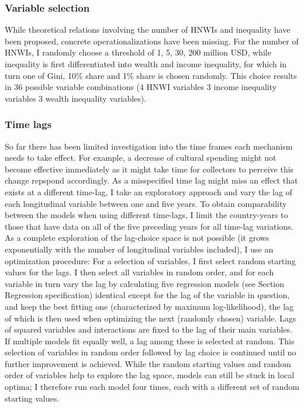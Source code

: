 \documentclass[11pt]{article}
\begin{document}
\subsubsection*{Variable selection}
\label{vrbl_slctn}
While theoretical relations involving the number of HNWIs and inequality have been proposed, concrete operationalizations have been missing.
For the number of HNWIs, I randomly choose a threshold of 1, 5, 30, 200 million USD, while inequality is first differentiated into wealth and income inequality, for which in turn one of Gini, 10\% share and 1\% share is chosen randomly.
This choice results in 36 possible variable combinations (4 HNWI variables \texttimes{} 3 income inequality variables \texttimes{} 3 wealth inequality variables). 


\subsubsection*{Time lags}

So far there has been limited investigation into the time frames each mechanism needs to take effect.
For example, a decrease of cultural spending might not become effective immediately as it might take time for collectors to perceive this change repspond accordingly.
As a misspecified time lag might miss an effect that exists at a different time-lag, I take an exploratory approach and vary the lag of each longitudinal variable between one and five years.
To obtain comparability between the models when using different time-lags, I limit the country-years to those that have data on all of the five preceding years for all time-lag variations.
As a complete exploration of the lag-choice space is not possible (it grows exponentially with the number of longitudinal variables included), I use an optimization procedure:
For a selection of variables, I first select random starting values for the lags.
I then select all variables in random order, and for each variable in turn vary the lag by calculating five regression models (see Section Regression specification) identical except for the lag of the variable in question, and keep the best fitting one (characterized by maximum log-likelihood), the lag of which is then used when optimizing the next (randomly chosen) variable.
Lags of squared variables and interactions are fixed to the lag of their main variables.
If multiple models fit equally well, a lag among these is selected at random.
This selection of variables in random order followed by lag choice is continued until no further improvement is achieved.
While the random starting values and random order of variables help to explore the lag space, models can still be stuck in local optima; I therefore run each model four times, each with a different set of random starting values. 
\end{document}

